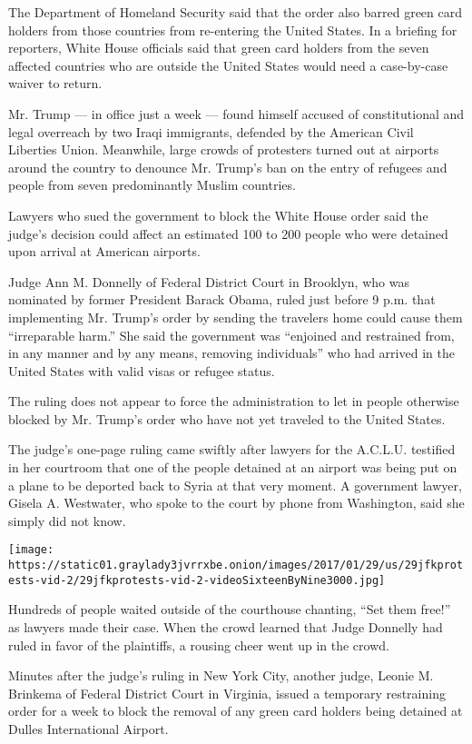 The Department of Homeland Security said that the order also barred
green card holders from those countries from re-entering the United
States. In a briefing for reporters, White House officials said that
green card holders from the seven affected countries who are outside the
United States would need a case-by-case waiver to return.

Mr. Trump --- in office just a week --- found himself accused of
constitutional and legal overreach by two Iraqi immigrants, defended by
the American Civil Liberties Union. Meanwhile, large crowds of
protesters turned out at airports around the country to denounce Mr.
Trump's ban on the entry of refugees and people from seven predominantly
Muslim countries.

Lawyers who sued the government to block the White House order said the
judge's decision could affect an estimated 100 to 200 people who were
detained upon arrival at American airports.

Judge Ann M. Donnelly of Federal District Court in Brooklyn, who was
nominated by former President Barack Obama, ruled just before 9 p.m.
that implementing Mr. Trump's order by sending the travelers home could
cause them ``irreparable harm.'' She said the government was ``enjoined
and restrained from, in any manner and by any means, removing
individuals'' who had arrived in the United States with valid visas or
refugee status.

The ruling does not appear to force the administration to let in people
otherwise blocked by Mr. Trump's order who have not yet traveled to the
United States.

The judge's one-page ruling came swiftly after lawyers for the A.C.L.U.
testified in her courtroom that one of the people detained at an airport
was being put on a plane to be deported back to Syria at that very
moment. A government lawyer, Gisela A. Westwater, who spoke to the court
by phone from Washington, said she simply did not know.

\texttt{[image: https://static01.graylady3jvrrxbe.onion/images/2017/01/29/us/29jfkprotests-vid-2/29jfkprotests-vid-2-videoSixteenByNine3000.jpg]}

Hundreds of people waited outside of the courthouse chanting, ``Set them
free!'' as lawyers made their case. When the crowd learned that Judge
Donnelly had ruled in favor of the plaintiffs, a rousing cheer went up
in the crowd.

Minutes after the judge's ruling in New York City, another judge, Leonie
M. Brinkema of Federal District Court in Virginia, issued a temporary
restraining order for a week to block the removal of any green card
holders being detained at Dulles International Airport.

